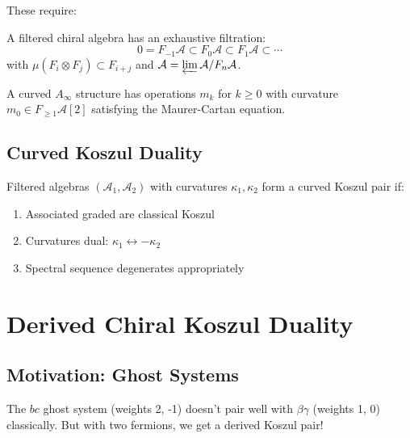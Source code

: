These require:

\begin{definition}
A filtered chiral algebra has an exhaustive filtration:
$$0 = F_{-1}\mathcal{A} \subset F_0\mathcal{A} \subset F_1\mathcal{A} \subset \cdots$$
with $\mu(F_i \otimes F_j) \subset F_{i+j}$ and $\mathcal{A} = \varprojlim \mathcal{A}/F_n\mathcal{A}$.
\end{definition}

\begin{definition}
A curved $A_\infty$ structure has operations $m_k$ for $k \geq 0$ with curvature $m_0 \in F_{\geq 1}\mathcal{A}[2]$ satisfying the Maurer-Cartan equation.
\end{definition}

\subsection{Curved Koszul Duality}

\begin{theorem}
Filtered algebras $(\mathcal{A}_1, \mathcal{A}_2)$ with curvatures $\kappa_1, \kappa_2$ form a curved Koszul pair if:
\begin{enumerate}
\item Associated graded are classical Koszul
\item Curvatures dual: $\kappa_1 \leftrightarrow -\kappa_2$
\item Spectral sequence degenerates appropriately
\end{enumerate}
\end{theorem}


\section{Derived Chiral Koszul Duality}

\subsection{Motivation: Ghost Systems}

The $bc$ ghost system (weights 2, -1) doesn't pair well with $\beta\gamma$ (weights 1, 0) classically. But with two fermions, we get a derived Koszul pair!

